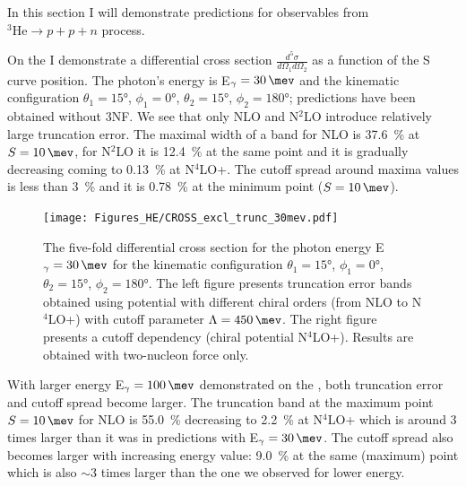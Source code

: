     In this section I will demonstrate predictions
    for observables from $^3\text{He} \rightarrow p + p + n$ process.
    
    On the  I demonstrate a differential cross section 
    $\frac{d^5\sigma}{d\Omega_1d\Omega_2}$ as a function of the S curve position.
    The photon's energy is  E$_\gamma=\SI{30}{\mev}$ and the kinematic configuration
    $\theta_1 = \ang{15}$, $\phi_1 = \ang{0}$,
    $\theta_2 = \ang{15}$, $\phi_2 = \ang{180}$; predictions have been obtained without 3NF.
    We see that only NLO and N$^2$LO introduce relatively large truncation error.
    The maximal width of a band for NLO is \SI{37.6}{\percent} at $S=\SI{10}{\mev}$,
    for N$^2$LO it is \SI{12.4}{\percent} at the same point and it is gradually decreasing
    coming to \SI{0.13}{\percent} at N$^4$LO+.
    The cutoff spread around maxima values is less than \SI{3}{\percent} and it is
    \SI{0.78}{\percent} at the minimum point ($S=\SI{10}{\mev}$).
    

    \begin{figure}[h]
        \begin{center}
            \texttt{[image: Figures\_HE/CROSS\_excl\_trunc\_30mev.pdf]}
            \end{center}
            \caption{The five-fold differential cross section for the photon 
            energy E$_\gamma=\SI{30}{\mev}$ for the kinematic configuration
            $\theta_1 = \ang{15}$, $\phi_1 = \ang{0}$,
            $\theta_2 = \ang{15}$, $\phi_2 = \ang{180}$.
            The left figure presents truncation error bands obtained using potential
            with different chiral orders (from NLO to N$^4$LO+) with
            cutoff parameter $\Lambda=\SI{450}{\mev}$.
            The right figure presents a cutoff dependency (chiral potential N$^4$LO+).
            Results are obtained with two-nucleon force only.}
            \label{CROSS_HE_EXCL_30}
        \end{figure}

    With larger energy E$_\gamma=\SI{100}{\mev}$ demonstrated on the ,
    both truncation error and cutoff spread become larger.
    The truncation band at the maximum point $S=\SI{10}{\mev}$ for NLO is \SI{55.0}{\percent}
    decreasing to \SI{2.2}{\percent} at N$^4$LO+ which is around 3 times larger than
    it was in predictions with E$_\gamma=\SI{30}{\mev}$.
    The cutoff spread also becomes larger with increasing energy value: \SI{9.0}{\percent}
    at the same (maximum) point which is also $\sim$3 times larger than the one we observed
    for lower energy.

